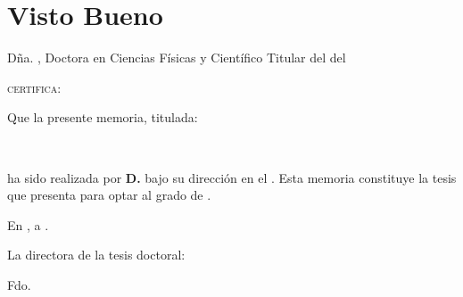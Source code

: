 \chapter*{Visto Bueno}
\thispagestyle{empty}
\bigskip

\begin{addmargin}[-1cm]{-3cm}

\vfil

D\~na. \textbf{\mySupervisor}, Doctora en Ciencias F\'isicas y Cient\'ifico Titular del {\myDepartment} del {\myUni}

\bigskip

\textsc{certifica:}

\bigskip

\noindent 
Que la presente memoria, titulada:

\bigskip
\begin{center}
\textbf{\emph{\myTitle}}\\
\textbf{\emph{\mySubtitle}}
\end{center}
\bigskip

\noindent
ha sido realizada por \textbf{D. \myName} bajo su direcci\'on en el {\myUni}. Esta memoria constituye la tesis que {\myName}  presenta para optar al grado de {\myDegree}. 

\vfil

\begin{center}
En \myLocation, a \myTime.
\end{center}
\vfil
La directora de la tesis doctoral:\\
\vspace{2cm}

\hfil Fdo. {\mySupervisor} \hfil  
\end{addmargin}

